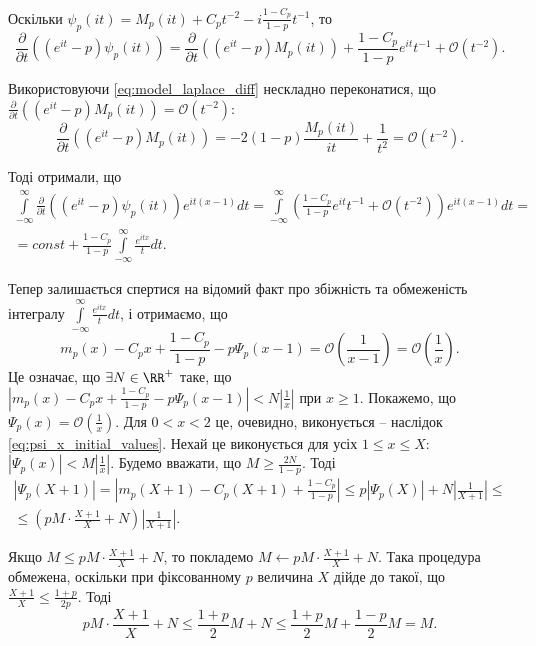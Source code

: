 Оскільки $\psi_{p}(it)=M_{p}(it) + C_{p} t^{-2} - i \frac{1-C_{p}}{1 - p} t^{-1}$, то
\begin{equation*}
\frac{\partial}{\partial t}((e^{it} - p) \psi_{p}(it)) = \frac{\partial}{\partial t}((e^{it} - p) M_{p}(it)) + \frac{1-C_{p}}{1 - p} e^{it} t^{-1} + \mathcal{O}(t^{-2}).
\end{equation*}

Використовуючи \eqref{eq:model_laplace_diff} нескладно переконатися, що $\frac{\partial}{\partial t}((e^{it} - p) M_{p}(it)) = \mathcal{O}(t^{-2})$:
\begin{equation*}
\frac{\partial}{\partial t}((e^{it} - p) M_{p}(it)) = -2(1-p) \frac{M_{p}(it)}{it} + \frac{1}{t^2} = \mathcal{O}(t^{-2}).
\end{equation*}

Тоді отримали, що
\begin{gather*}
\int\limits_{-\infty}^{\infty} \frac{\partial}{\partial t}((e^{it} - p) \psi_{p}(it)) e^{it(x-1)} dt = \int\limits_{-\infty}^{\infty} \left(\frac{1-C_{p}}{1 - p} e^{it} t^{-1} + \mathcal{O}(t^{-2}) \right) e^{it(x-1)} dt = \\
= const + \frac{1-C_{p}}{1 - p} \int\limits_{-\infty}^{\infty} \frac{e^{itx}}{t} dt.
\end{gather*}

Тепер залишається спертися на відомий факт про збіжність та обмеженість інтегралу $\int\limits_{-\infty}^{\infty} \frac{e^{itx}}{t} dt$, і отримаємо, що 
\begin{equation*}
m_{p}(x) - C_{p} x + \frac{1 - C_p}{1-p} - p\Psi_{p}(x-1) = \mathcal{O}\left(\frac{1}{x-1}\right) = \mathcal{O}\left(\frac{1}{x}\right).
\end{equation*}
Це означає, що $\exists N \in \RR^{+}$ таке, що $|m_{p}(x) - C_{p} x + \frac{1 - C_p}{1-p} - p\Psi_{p}(x-1)| < N \left|\frac{1}{x}\right|$ при $x \geq 1$. Покажемо, що $\Psi_{p}(x) = \mathcal{O}(\frac{1}{x})$. Для $0<x<2$ це, очевидно, виконується -- наслідок \eqref{eq:psi_x_initial_values}. Нехай це виконується для усіх $1 \leq x \leq X$: $|\Psi_{p}(x)| < M\left|\frac{1}{x}\right|$. Будемо вважати, що $M \geq \frac{2N}{1 - p}$. Тоді
\begin{gather*}
|\Psi_{p}(X + 1)| = |m_{p}(X+1) - C_{p} (X+1) + \frac{1 - C_p}{1-p}| \leq p|\Psi_{p}(X)| + N \left|\frac{1}{X+1}\right| \leq \\
\leq (p M \cdot \frac{X+1}{X} + N) \left|\frac{1}{X+1}\right|.
\end{gather*}

Якщо $M \leq p M \cdot \frac{X+1}{X} + N$, то покладемо $M \leftarrow p M \cdot \frac{X+1}{X} + N$. Така процедура обмежена, оскільки при фіксованному $p$ величина $X$ дійде до такої, що $\frac{X+1}{X} \leq \frac{1+p}{2p}$. Тоді
\begin{equation*}
p M \cdot \frac{X+1}{X} + N \leq \frac{1+p}{2} M + N \leq \frac{1+p}{2} M + \frac{1-p}{2} M = M.
\end{equation*}

